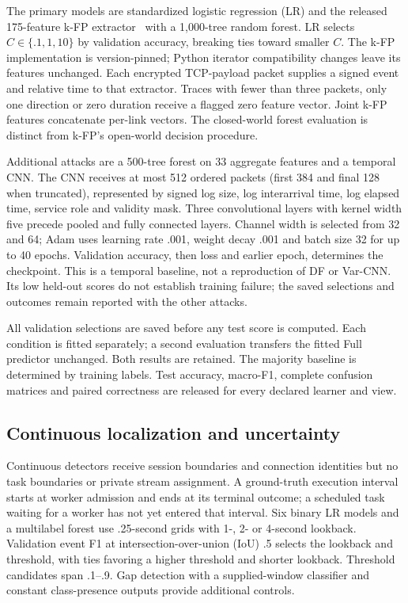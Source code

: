 The primary models are standardized logistic regression (LR) and the released 175-feature k-FP extractor~\cite{hayes2016kfp} with a 1,000-tree random forest. LR selects $C\in\{.1,1,10\}$ by validation accuracy, breaking ties toward smaller $C$. The k-FP implementation is version-pinned; Python iterator compatibility changes leave its features unchanged. Each encrypted TCP-payload packet supplies a signed event and relative time to that extractor. Traces with fewer than three packets, only one direction or zero duration receive a flagged zero feature vector. Joint k-FP features concatenate per-link vectors. The closed-world forest evaluation is distinct from k-FP's open-world decision procedure.

Additional attacks are a 500-tree forest on 33 aggregate features and a temporal CNN. The CNN receives at most 512 ordered packets (first 384 and final 128 when truncated), represented by signed log size, log interarrival time, log elapsed time, service role and validity mask. Three convolutional layers with kernel width five precede pooled and fully connected layers. Channel width is selected from 32 and 64; Adam uses learning rate .001, weight decay .001 and batch size 32 for up to 40 epochs. Validation accuracy, then loss and earlier epoch, determines the checkpoint. This is a temporal baseline, not a reproduction of DF or Var-CNN. Its low held-out scores do not establish training failure; the saved selections and outcomes remain reported with the other attacks.

All validation selections are saved before any test score is computed. Each condition is fitted separately; a second evaluation transfers the fitted Full predictor unchanged. Both results are retained. The majority baseline is determined by training labels. Test accuracy, macro-F1, complete confusion matrices and paired correctness are released for every declared learner and view.

\subsection{Continuous localization and uncertainty}
Continuous detectors receive session boundaries and connection identities but no task boundaries or private stream assignment. A ground-truth execution interval starts at worker admission and ends at its terminal outcome; a scheduled task waiting for a worker has not yet entered that interval. Six binary LR models and a multilabel forest use .25-second grids with 1-, 2- or 4-second lookback. Validation event F1 at intersection-over-union (IoU) .5 selects the lookback and threshold, with ties favoring a higher threshold and shorter lookback. Threshold candidates span .1--.9. Gap detection with a supplied-window classifier and constant class-presence outputs provide additional controls.

